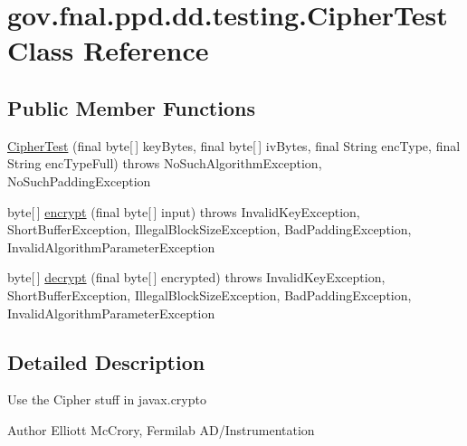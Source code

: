 \hypertarget{classgov_1_1fnal_1_1ppd_1_1dd_1_1testing_1_1CipherTest}{\section{gov.\-fnal.\-ppd.\-dd.\-testing.\-Cipher\-Test Class Reference}
\label{classgov_1_1fnal_1_1ppd_1_1dd_1_1testing_1_1CipherTest}
}
\subsection*{Public Member Functions}
\begin{DoxyCompactItemize}
\item 
\hyperlink{classgov_1_1fnal_1_1ppd_1_1dd_1_1testing_1_1CipherTest_afd343fab65e49e9730d5deaa4cceeccf}{Cipher\-Test} (final byte\mbox{[}$\,$\mbox{]} key\-Bytes, final byte\mbox{[}$\,$\mbox{]} iv\-Bytes, final String enc\-Type, final String enc\-Type\-Full)  throws No\-Such\-Algorithm\-Exception, No\-Such\-Padding\-Exception 
\item 
byte\mbox{[}$\,$\mbox{]} \hyperlink{classgov_1_1fnal_1_1ppd_1_1dd_1_1testing_1_1CipherTest_ac84a43bcd663ea55ea5f7879a7a2db18}{encrypt} (final byte\mbox{[}$\,$\mbox{]} input)  throws Invalid\-Key\-Exception, Short\-Buffer\-Exception, Illegal\-Block\-Size\-Exception, 			\-Bad\-Padding\-Exception, Invalid\-Algorithm\-Parameter\-Exception 
\item 
byte\mbox{[}$\,$\mbox{]} \hyperlink{classgov_1_1fnal_1_1ppd_1_1dd_1_1testing_1_1CipherTest_aaf2e8db0bb699174053a1bf902837d9c}{decrypt} (final byte\mbox{[}$\,$\mbox{]} encrypted)  throws Invalid\-Key\-Exception, Short\-Buffer\-Exception, Illegal\-Block\-Size\-Exception, 			\-Bad\-Padding\-Exception, Invalid\-Algorithm\-Parameter\-Exception 
\end{DoxyCompactItemize}


\subsection{Detailed Description}
Use the Cipher stuff in javax.\-crypto

\begin{DoxyAuthor}{Author}
Elliott Mc\-Crory, Fermilab A\-D/\-Instrumentation 
\end{DoxyAuthor}


